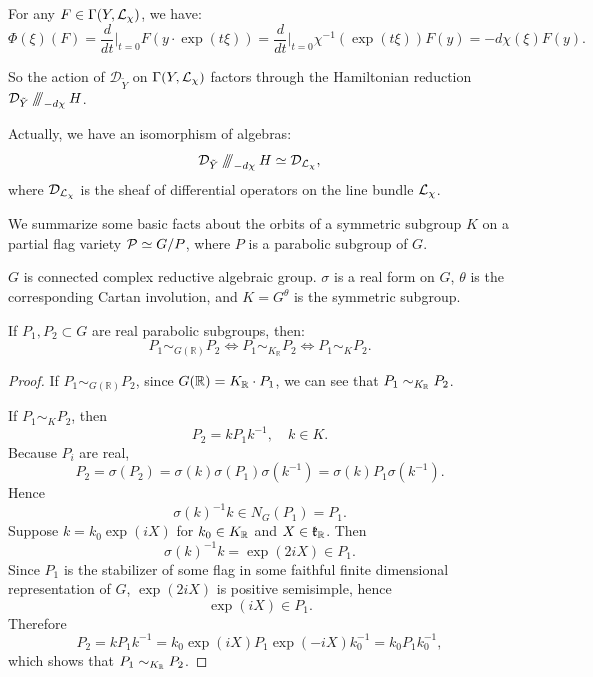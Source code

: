 For any $F \in \Gamma(Y,\mathcal{L}_{\chi})$, we have:
\[
  \Phi(\xi)(F) = \frac{d}{dt}\Big|_{t=0} F(y \cdot \exp(t\xi)) = \frac{d}{dt}\Big|_{t=0} \chi^{-1}(\exp(t\xi)) F(y) = -d\chi(\xi) F(y).
\]

So the action of $\mathcal{D}_{\tilde{Y}}$ on $\Gamma(Y,\mathcal{L}_{\chi})$ factors through the Hamiltonian reduction $\mathcal{D}_{\tilde{Y}} \mathbin{/\mkern-6mu/\mkern-6mu/}_{-d\chi} H$.

\begin{rk}
  Actually, we have an isomorphism of algebras:
\[
  \mathcal{D}_{\tilde{Y}} \mathbin{/\mkern-6mu/\mkern-6mu/}_{-d\chi} H \simeq \mathcal{D}_{\mathcal{L}_{\chi}},
\]
where $\mathcal{D}_{\mathcal{L}_{\chi}}$ is the sheaf of differential operators on the line bundle $\mathcal{L}_{\chi}$.
\end{rk}



We summarize some basic facts about the orbits of a symmetric subgroup $K$ on a partial flag variety $\mathcal{P} \simeq G/P$, where $P$ is a parabolic subgroup of $G$.

$G$ is connected complex reductive algebraic group. $\sigma$ is a real form on $G$, $\theta$ is the corresponding Cartan involution, and $K = G^\theta$ is the symmetric subgroup.

\begin{prop}
  If \(P_1,P_2\subset G\) are real parabolic subgroups, then: 
    \[
    \boxed{
    P_1\sim_{G(\mathbb R)}P_2
    \iff
    P_1\sim_{K_{\mathbb R}}P_2
    \iff
    P_1\sim_K P_2 .
    }
    \]
\end{prop}


\begin{proof}
  If $P_1\sim_{G(\mathbb R)}P_2$, since $G(\mathbb{R}) = K_{\mathbb{R}} \cdot P_1$, we can see that $P_1 \sim_{K_{\mathbb{R}}} P_2$.

  If $P_1 \sim_{K} P_2$, then
  \[
    P_2 = k P_1 k^{-1}, \quad k \in K.
  \]
  Because $P_i$ are real,
  \[
    P_2 = \sigma(P_2) = \sigma(k) \sigma(P_1) \sigma(k^{-1}) = \sigma(k) P_1 \sigma(k^{-1}).
  \]
  Hence
  \[
    \sigma(k)^{-1} k \in N_G(P_1) = P_1.
  \]
  Suppose $k = k_0 \exp(iX)$ for $k_0 \in K_{\mathbb{R}}$ and $X \in \mathfrak{k}_{\mathbb{R}}$. Then
  \[
    \sigma(k)^{-1} k = \exp(2iX) \in P_1.
  \]
  Since $P_1$ is the stabilizer of some flag in some faithful finite dimensional representation of $G$, $\exp(2iX)$ is positive semisimple, hence 
  \[
    \exp(iX) \in P_1.
  \]
  Therefore
  \[
    P_2 = k P_1 k^{-1} = k_0 \exp(iX) P_1 \exp(-iX) k_0^{-1} = k_0 P_1 k_0^{-1},
  \]
  which shows that $P_1 \sim_{K_{\mathbb{R}}} P_2$.
\end{proof}





